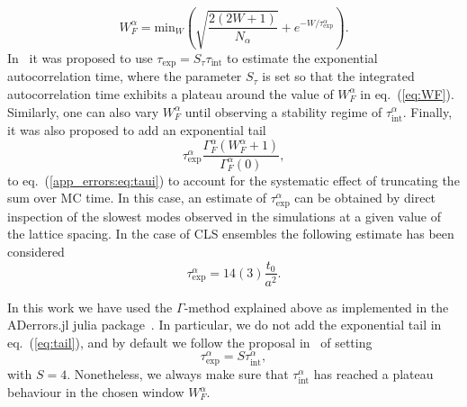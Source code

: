 \begin{equation}
\label{eq:WF}
W_F^{\alpha}=\textrm{min}_W\left(\sqrt{\frac{2(2W+1)}{N_{\alpha}}}+e^{-W/\tau_{\textrm{exp}}^{\alpha}}\right).
\end{equation}
In~\citep{Wolff:2003sm} it was proposed to use $\tau_{\textrm{exp}}=S_{\tau}\tau_{\textrm{int}}$ to estimate the exponential autocorrelation time, where the parameter $S_{\tau}$ 
is set so that the integrated autocorrelation time exhibits a plateau around the value of $W_F^\alpha$ in eq.~(\ref{eq:WF}). Similarly, one can also vary $W_F^{\alpha}$ until observing a stability regime of $\tau_{\textrm{int}}^{\alpha}$. Finally, it was also proposed to add an exponential tail~\citep{Schaefer:2010hu}
\begin{equation}
  \label{eq:tail}
\tau_{\textrm{exp}}^{\alpha}\frac{\Gamma_F^{\alpha}(W_F^{\alpha}+1)}{\Gamma_F^{\alpha}(0)},
\end{equation}
to eq.~(\ref{app_errors:eq:taui}) to account for the systematic effect of truncating the sum over MC time. In this case, an estimate of $\tau_{\textrm{exp}}^{\alpha}$ can be obtained by direct inspection of the slowest modes observed in the simulations at a given value of the lattice spacing. In the case of CLS ensembles the following estimate has been considered~\citep{Bruno:2014jqa}
\begin{equation}
\tau_{\textrm{exp}}^{\alpha}=14(3)\frac{t_0}{a^2}.
\end{equation}

In this work we have used the $\Gamma$-method explained above as
implemented in the ADerrors.jl julia package~\citep{Ramos:2020scv}. In
particular, we do not add the exponential tail in eq.~(\ref{eq:tail}),
and by default we follow the proposal in~\citep{Wolff:2003sm} of setting
\
\begin{equation}
\label{eq:Stau}
\tau_{\textrm{exp}}^{\alpha}=S\tau_{\textrm{int}}^{\alpha},
\end{equation}
with $S=4$. Nonetheless, we always make sure that
$\tau_{\textrm{int}}^{\alpha}$ has reached a plateau behaviour in the chosen
window $W_{F}^{\alpha}$.


